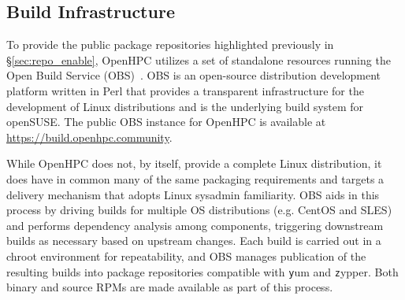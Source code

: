 \documentclass{sig-alternate-05-2015}
\begin{document}




\subsection{Build Infrastructure} \label{sec:build_infra}

To provide the public package repositories highlighted previously in
\S\ref{sec:repo_enable}, OpenHPC utilizes a set of standalone resources
running the Open Build Service (OBS)~\cite{OBS_url}.  OBS is an open-source
distribution development platform written in Perl that provides a transparent
infrastructure for the development of Linux distributions and is the underlying
build system for openSUSE.  The public OBS instance for OpenHPC is available at
\url{https://build.openhpc.community}.

While OpenHPC does not, by itself, provide a complete Linux distribution, it
does have in common many of the same packaging requirements and targets a
delivery mechanism that adopts Linux sysadmin familiarity.  OBS aids in this
process by driving builds for multiple OS distributions (e.g. CentOS and SLES)
and performs dependency analysis among components, triggering downstream
builds as necessary based on upstream changes. Each build is carried out in a
chroot environment for repeatability, and OBS manages publication of the resulting
builds into package repositories compatible with {\texttt yum} and {\texttt
  zypper}. Both binary and source RPMs are made available as part of this process.
\end{document}
